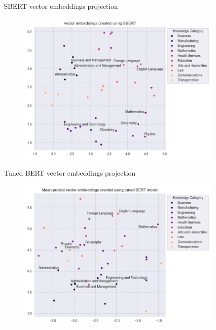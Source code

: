 \documentclass{beamer}
\begin{document}
\begin{frame}{SBERT vector embeddings projection}
  \begin{figure}[ht!]
    \centering
    \includegraphics[width=0.9\textwidth]{../plots/base_sbert.png}
\end{figure}

\end{frame}

\begin{frame}{Tuned BERT vector embeddings projection}
  \begin{figure}[ht!]
    \centering
    \includegraphics[width=0.9\textwidth]{../plots/tuned_bert.png}
\end{figure}

\end{frame}
\end{document}

